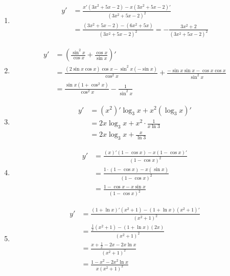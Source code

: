 \begin{solution}
    \begin{enumerate}
        \item \begin{align*}
                  y' & = \frac{x' (3x^2+5x-2) - x (3x^2+5x-2)'}{(3x^2+5x-2)^2}                     \\
                     & =\frac{(3x^2+5x-2)-(6x^2+5x)}{(3x^2+5x-2)^2}=- \frac{3x^2+2}{(3x^2+5x-2)^2}
              \end{align*}
        \item \begin{align*}
                  y' & = \left(\frac{\sin^2 x}{\cos x} + \frac{\cos x}{\sin x} \right)'                                                \\
                     & =\frac{(2\sin x \cos x)\cos x - \sin^2 x (-\sin x)}{\cos^2 x} + \frac{-\sin x \sin x - \cos x \cos x}{\sin^2 x} \\
                     & =\frac{\sin x(1+\cos^2x)}{\cos^2 x}- \frac{1}{\sin^2 x}
              \end{align*}
        \item \begin{align*}
                  y' & = (x^2)' \log_3 x + x^2 (\log_3 x)'         \\
                     & = 2x \log_3 x + x^2 \cdot \frac{1}{x \ln 3} \\
                     & = 2x \log_3 x + \frac{x}{\ln 3}
              \end{align*}
        \item \begin{align*}
                  y' & = \frac{(x)' (1-\cos x) - x (1-\cos x)'}{(1-\cos x)^2} \\
                     & = \frac{1 \cdot (1-\cos x) - x (\sin x)}{(1-\cos x)^2} \\
                     & = \frac{1-\cos x - x \sin x}{(1-\cos x)^2}
              \end{align*}
        \item \begin{align*}
                  y' & = \frac{(1+\ln x)'(x^2+1) - (1+\ln x)(x^2+1)'}{(x^2+1)^2} \\
                     & = \frac{\frac{1}{x}(x^2+1) - (1+\ln x)(2x)}{(x^2+1)^2}    \\
                     & = \frac{x+\frac{1}{x} - 2x - 2x \ln x}{(x^2+1)^2}         \\
                     & = \frac{1-x^2-2x^2\ln x}{x(x^2+1)^2}

\end{align*}
\end{enumerate}
\end{solution}
